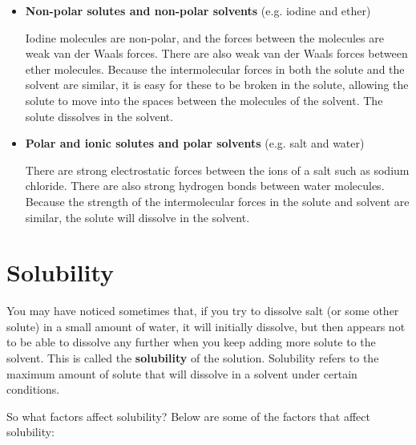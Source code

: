 \begin{itemize}
\item{\textbf{Non-polar solutes and non-polar solvents} (e.g. iodine and ether)

Iodine molecules are non-polar, and the forces between the molecules are weak van der Waals forces. There are also weak van der Waals forces between ether molecules. Because the intermolecular forces in both the solute and the solvent are similar, it is easy for these to be broken in the solute, allowing the solute to move into the spaces between the molecules of the solvent. The solute dissolves in the solvent.\\}

\item{\textbf{Polar and ionic solutes and polar solvents} (e.g. salt and water})

There are strong electrostatic forces between the ions of a salt such as sodium chloride. There are also strong hydrogen bonds between water molecules. Because the strength of the intermolecular forces in the solute and solvent are similar, the solute will dissolve in the solvent.
\end{itemize}

\section{Solubility}
\label{sec:soln:solubility}

You may have noticed sometimes that, if you try to dissolve salt (or some other solute) in a small amount of water, it will initially dissolve, but then appears not to be able to dissolve any further when you keep adding more solute to the solvent. This is called the \textbf{solubility} of the solution. Solubility refers to the maximum amount of solute that will dissolve in a solvent under certain conditions.


So what factors affect solubility? Below are some of the factors that affect solubility:

